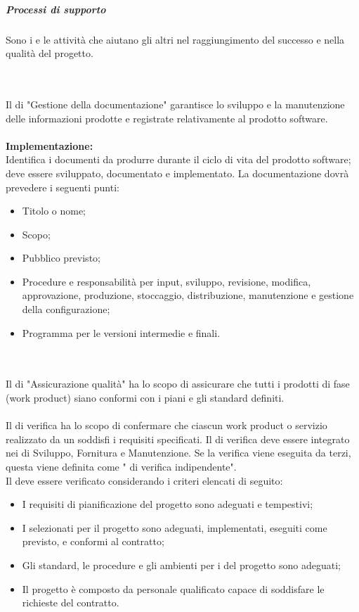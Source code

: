 \subparagraph{Processi di supporto}
Sono i  e le attività che aiutano gli altri  nel raggiungimento del successo e nella qualità del progetto.

\mbox{}\\ \\
Il  di "Gestione della documentazione" garantisce lo sviluppo e la manutenzione delle informazioni prodotte e registrate relativamente al prodotto software. \\ \\
\textbf{Implementazione:} \\ 
Identifica i documenti da produrre durante il ciclo di vita del prodotto software;
deve essere sviluppato, documentato e implementato. La documentazione dovrà prevedere i seguenti punti: 
\begin{itemize}
    \item Titolo o nome;
    \item Scopo;
    \item Pubblico previsto;
    \item Procedure e responsabilità per input, sviluppo, revisione, modifica, approvazione, produzione, stoccaggio, distribuzione, manutenzione e gestione della configurazione;
    \item Programma per le versioni intermedie e finali.
\end{itemize}

\mbox{}\\ \\
Il  di "Assicurazione qualità" ha lo scopo di assicurare che tutti i prodotti di fase (work product) siano conformi con i piani e gli standard definiti.
\mbox{}\\ \\
Il  di verifica ha lo scopo di confermare che ciascun work product o servizio realizzato da un  soddisfi i requisiti specificati. 
Il  di verifica deve essere integrato nei  di Sviluppo, Fornitura e Manutenzione. Se la verifica viene eseguita da terzi, questa viene definita come " di verifica indipendente".
\\
Il  deve essere verificato considerando i criteri elencati di seguito:
\begin{itemize}
    \item I requisiti di pianificazione del progetto sono adeguati e tempestivi;
    \item I  selezionati per il progetto sono adeguati, implementati, eseguiti come previsto, e conformi al contratto;
    \item Gli standard, le procedure e gli ambienti per i  del progetto sono adeguati;
    \item Il progetto è composto da personale qualificato capace di soddisfare le richieste del contratto.
\end{itemize}

